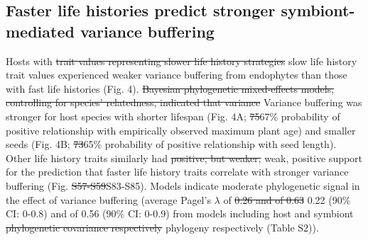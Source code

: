 \documentclass[lineno, sn-basic]{sn-jnl}%
\providecommand{\DIFadd}[1]{{\protect\color{blue}#1}} %
\providecommand{\DIFdel}[1]{{\protect\color{red}\protect\scriptsize\sout{#1}}}
\providecommand{\DIFadd}[1]{{\protect\color{blue}\uwave{#1}}} %
\providecommand{\DIFdel}[1]{{\protect\color{red}\sout{#1}}}                      %
\providecommand{\DIFaddbegin}{} %
\providecommand{\DIFaddend}{} %
\providecommand{\DIFdelbegin}{} %
\providecommand{\DIFdelend}{} %
\newcommand{\DIFscaledelfig}{0.5}
\newlength{\DIFdelgraphicswidth} %
\newlength{\DIFdelgraphicsheight} %
\newcommand{\DIFaddincludegraphics}[2][]{{\color{blue}\fbox{\DIFOincludegraphics[#1]{#2}}}} %
\newcommand{\DIFdelincludegraphics}[2][]{%
\sbox{\DIFdelgraphicsbox}{\DIFOincludegraphics[#1]{#2}}%
\settoboxwidth{\DIFdelgraphicswidth}{\DIFdelgraphicsbox} %
\settoboxtotalheight{\DIFdelgraphicsheight}{\DIFdelgraphicsbox} %
\scalebox{\DIFscaledelfig}{%
\parbox[b]{\DIFdelgraphicswidth}{\usebox{\DIFdelgraphicsbox}\\[-\baselineskip] \rule{\DIFdelgraphicswidth}{0em}}\llap{\resizebox{\DIFdelgraphicswidth}{\DIFdelgraphicsheight}{%
\setlength{\unitlength}{\DIFdelgraphicswidth}%
\begin{picture}(1,1)%
\thicklines\linethickness{2pt} %
{\color[rgb]{1,0,0}\put(0,0){\framebox(1,1){}}}%
{\color[rgb]{1,0,0}\put(0,0){\line( 1,1){1}}}%
{\color[rgb]{1,0,0}\put(0,1){\line(1,-1){1}}}%
\end{picture}%
}\hspace*{3pt}}} %
} %
\DeclareRobustCommand{\DIFaddbegin}{\DIFOaddbegin \let\includegraphics\DIFaddincludegraphics} %
\DeclareRobustCommand{\DIFaddend}{\DIFOaddend \let\includegraphics\DIFOincludegraphics} %
\DeclareRobustCommand{\DIFdelbegin}{\DIFOdelbegin \let\includegraphics\DIFdelincludegraphics} %
\DeclareRobustCommand{\DIFdelend}{\DIFOaddend \let\includegraphics\DIFOincludegraphics} %
\begin{document}
\subsection*{Faster life histories predict stronger symbiont-mediated variance buffering}
Hosts with \DIFdelbegin \DIFdel{trait values representing slower life history strategies }\DIFdelend \DIFaddbegin \DIFadd{slow life history trait values }\DIFaddend experienced weaker variance buffering from endophytes than those with fast life histories (Fig. 4).
\DIFdelbegin \DIFdel{Bayesian phylogenetic mixed-effects models, controlling for species' relatedness, indicated that variance }\DIFdelend \DIFaddbegin \DIFadd{Variance }\DIFaddend buffering was stronger for host species with shorter lifespan (Fig. 4A; \DIFdelbegin \DIFdel{75}\DIFdelend \DIFaddbegin \DIFadd{67}\DIFaddend \% probability of positive relationship with empirically observed maximum plant age) and smaller seeds (Fig. 4B; \DIFdelbegin \DIFdel{73}\DIFdelend \DIFaddbegin \DIFadd{65}\DIFaddend \% probability of positive relationship with seed length).
Other life history traits similarly had \DIFdelbegin \DIFdel{positive, but weaker, }\DIFdelend \DIFaddbegin \DIFadd{weak, positive }\DIFaddend support for the prediction that faster life history traits correlate with stronger variance buffering (Fig. \DIFdelbegin \DIFdel{S57-S59}\DIFdelend \DIFaddbegin \DIFadd{S83-S85}\DIFaddend ). 
Models indicate moderate phylogenetic signal in the effect of variance buffering (average Pagel's $\lambda$ of \DIFdelbegin \DIFdel{0.26 and of 0.63 }\DIFdelend \DIFaddbegin \DIFadd{0.22 (90\% CI: 0-0.8) and of 0.56 (90\% CI: 0-0.9) }\DIFaddend from models including host and symbiont \DIFdelbegin \DIFdel{phylogenetic covariance respectively }\DIFdelend \DIFaddbegin \DIFadd{phylogeny respectively (Table S2)}\DIFaddend ).
\end{document}
